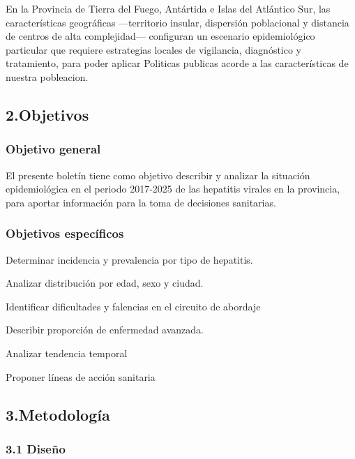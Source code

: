 \documentclass[
  letterpaper,
  DIV=11,
  numbers=noendperiod]{scrartcl}
\begin{document}
En la Provincia de Tierra del Fuego, Antártida e Islas del Atlántico
Sur, las características geográficas ---territorio insular, dispersión
poblacional y distancia de centros de alta complejidad--- configuran un
escenario epidemiológico particular que requiere estrategias locales de
vigilancia, diagnóstico y tratamiento, para poder aplicar Politicas
publicas acorde a las características de nuestra pobleacion.

\hypertarget{objetivos}{%
\subsection{\texorpdfstring{\textbf{2.Objetivos}}{2.Objetivos}}\label{objetivos}}

\hypertarget{objetivo-general}{%
\subsubsection{\texorpdfstring{\textbf{Objetivo
general}}{Objetivo general}}\label{objetivo-general}}

El presente boletín tiene como objetivo describir y analizar la
situación epidemiológica en el periodo 2017-2025 de las hepatitis
virales en la provincia, para aportar información para la toma de
decisiones sanitarias.

\hypertarget{objetivos-especuxedficos}{%
\subsubsection{\texorpdfstring{\textbf{Objetivos
específicos}}{Objetivos específicos}}\label{objetivos-especuxedficos}}

Determinar incidencia y prevalencia por tipo de hepatitis.

Analizar distribución por edad, sexo y ciudad.

Identificar dificultades y falencias en el circuito de abordaje

Describir proporción de enfermedad avanzada.

Analizar tendencia temporal

Proponer líneas de acción sanitaria

\hypertarget{metodologuxeda}{%
\subsection{\texorpdfstring{\textbf{3.Metodología}}{3.Metodología}}\label{metodologuxeda}}

\hypertarget{diseuxf1o}{%
\subsubsection{3.1 Diseño}\label{diseuxf1o}}
\end{document}
